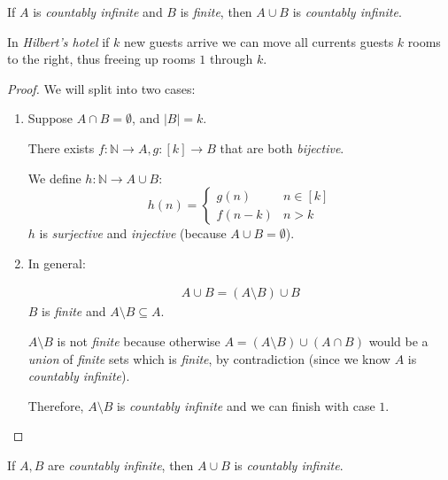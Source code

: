 \documentclass[00_complete]{subfiles}
\begin{document}
\begin{claim}
    If $A$ is \emph{countably infinite} and $B$ is \emph{finite}, then $A\cup
    B$ is \emph{countably infinite}.
\end{claim}
\begin{note}
    In \emph{Hilbert's hotel} if $k$ new guests arrive we can move all currents
    guests $k$ rooms to the right, thus freeing up rooms $1$ through $k$.
\end{note}
\begin{proof}
    We will split into two cases:
    \begin{enumerate}
        \item Suppose $A\cap B = \emptyset$, and $|B|=k$.

        There exists $f:\mathbb{N}\to A, g:[k]\to B$ that are both
        \emph{bijective}.

        We define $h:\mathbb{N}\to A \cup B$:
        $$h(n)=\begin{cases}
            g(n)   & n \in [k] \\
            f(n-k) & n > k
        \end{cases}$$
        $h$ is \emph{surjective} and \emph{injective} (because $A\cup B =
        \emptyset$).
        \item In general:

        \begin{gather*}
            A \cup B = (A \setminus B) \cup B
        \end{gather*}
        $B$ is \emph{finite} and $A \setminus B \subseteq A$.

        $A \setminus B$ is not \emph{finite} because otherwise $A=(A\setminus
        B)\cup(A\cap B)$ would be a \emph{union} of \emph{finite} sets which is
        \emph{finite}, by contradiction (since we know $A$ is \emph{countably
        infinite}).

        Therefore, $A \setminus B$ is \emph{countably infinite} and we can
        finish with case $1$.
    \end{enumerate}
\end{proof}
\begin{claim}
    If $A,B$ are \emph{countably infinite}, then $A \cup B$ is \emph{countably
    infinite}.
\end{claim}
\end{document}
